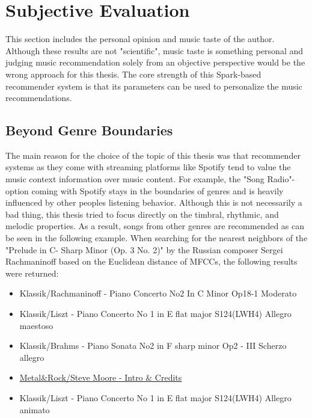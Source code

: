 \section{Subjective Evaluation}

This section includes the personal opinion and music taste of the author. Although these results are not "scientific", music taste is something personal and judging music recommendation solely from an objective perspective would be the wrong approach for this thesis. The core strength of this Spark-based recommender system is that its parameters can be used to personalize the music recommendations. 

\subsection{Beyond Genre Boundaries}

The main reason for the choice of the topic of this thesis was that recommender systems as they come with streaming platforms like Spotify tend to value the music context information over music content. For example, the "Song Radio"- option coming with Spotify stays in the boundaries of genres and is heavily influenced by other peoples listening behavior. Although this is not necessarily a bad thing, this thesis tried to focus directly on the timbral, rhythmic, and melodic properties. As a result, songs from other genres are recommended as can be seen in the following example. 
\noindent When searching for the nearest neighbors of the "Prelude in C- Sharp Minor (Op. 3 No. 2)" by the Russian composer Sergei Rachmaninoff based on the Euclidean distance of MFCCs, the following results were returned: 

\begin{itemize}
	\setlength\itemsep{-0.5em}
	\item Klassik/Rachmaninoff - Piano Concerto No2 In C Minor Op18-1 Moderato
	\item Klassik/Liszt - Piano Concerto No 1 in E flat major S124(LWH4) Allegro maestoso
	\item Klassik/Brahms - Piano Sonata No2 in F sharp minor Op2 - III Scherzo allegro
	\item \underline{Metal\&Rock/Steve Moore - Intro \& Credits}
	\item Klassik/Liszt - Piano Concerto No 1 in E flat major S124(LWH4) Allegro animato
\end{itemize}

